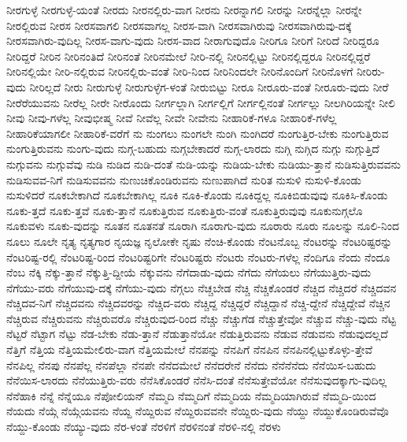 {ನೀರಗುಳ್ಳೆ
ನೀರಗುಳ್ಳೆ-ಯಂತೆ
ನೀರದು
ನೀರನಲ್ಲಿರು-ವಾಗ
ನೀರನು
ನೀರನ್ನಾಗಲಿ
ನೀರನ್ನು
ನೀರನ್ನೆಲ್ಲಾ
ನೀರನ್ನೇ
ನೀರಲ್ಲಿರುವ
ನೀರಸ
ನೀರಸವಾಗಲಿ
ನೀರಸವಾಗಲ್ಲ
ನೀರಸ-ವಾಗಿ
ನೀರಸವಾಗಿರುವು
ನೀರಸವಾಗಿರುವು-ದಕ್ಕೆ
ನೀರಸವಾಗಿರು-ವುದಿಲ್ಲ
ನೀರಸ-ವಾಗು-ವುದು
ನೀರಸ-ವಾದ
ನೀರಾಗುವುದೊ
ನೀರಿಗೂ
ನೀರಿಗೆ
ನೀರಿದೆ
ನೀರಿದ್ದರೂ
ನೀರಿದ್ದರೆ
ನೀರಿನ
ನೀರಿನಂತಿದೆ
ನೀರಿನಂತೆ
ನೀರಿನಮೇಲೆ
ನೀರಿ-ನಲ್ಲಿ
ನೀರಿನಲ್ಲಿಟ್ಟು
ನೀರಿನಲ್ಲಿದ್ದರೂ
ನೀರಿನಲ್ಲಿದ್ದರೆ
ನೀರಿನಲ್ಲಿಯೇ
ನೀರಿ-ನಲ್ಲಿರುವ
ನೀರಿನಲ್ಲಿರು-ವಂತೆ
ನೀರಿ-ನಿಂದ
ನೀರಿನಿಂದಲೇ
ನೀರಿನೊಂದಿಗೆ
ನೀರಿನೊಳಗೆ
ನೀರಿರು-ವುದು
ನೀರಿಲ್ಲದೆ
ನೀರು
ನೀರುಗುಳ್ಳೆ
ನೀರುಗುಳ್ಳೆಗ-ಳಂತೆ
ನೀರುಬಿಟ್ಟು
ನೀರೂ
ನೀರೂರು-ವಂತೆ
ನೀರೂರು-ವುದು
ನೀರೆ
ನೀರೆರೆಯುವನು
ನೀರೆಲ್ಲ
ನೀರೇ
ನೀರೊಂದು
ನೀರ್ಗಲ್ಲಾಗಿ
ನೀರ್ಗಲ್ಲಿಗೆ
ನೀರ್ಗಲ್ಲಿನಂತೆ
ನೀರ್ಗಲ್ಲು
ನೀಲಗಿರಿಯನ್ನೇ
ನೀಲಿ
ನೀವು
ನೀವು-ಗಳೆಲ್ಲ
ನೀವುಭೀಷ್ಮ
ನೀವೆ
ನೀವೆಲ್ಲ
ನೀವೇ
ನೀವೇನು
ನೀಹಾರಿಕೆ-ಗಳೂ
ನೀಹಾರಿಕೆ-ಗಳೆಲ್ಲ
ನೀಹಾರಿಕೆಯಾಗಲೀ
ನೀಹಾರಿಕೆ-ವರೆಗೆ
ನು
ನುಂಗಲು
ನುಂಗಲೇ
ನುಂಗಿ
ನುಂಗಿದರೆ
ನುಂಗುತ್ತಿರ-ಬೇಕು
ನುಂಗುತ್ತಿರುವ
ನುಂಗುತ್ತಿರುವನು
ನುಂಗು-ವುದು
ನುಗ್ಗ-ಬಹುದು
ನುಗ್ಗಬೇಕಾದರೆ
ನುಗ್ಗ-ಲಾರದು
ನುಗ್ಗಿ
ನುಗ್ಗಿದ
ನುಗ್ಗು
ನುಗ್ಗುತ್ತಿದೆ
ನುಗ್ಗುವನು
ನುಗ್ಗುವೆವು
ನುಡಿ
ನುಡಿದ
ನುಡಿ-ದಂತೆ
ನುಡಿ-ಯನ್ನು
ನುಡಿಯ-ಬೇಕು
ನುಡಿಯು-ತ್ತಾನೆ
ನುಡಿಸುತ್ತಿರುವವನು
ನುಡಿಸುವವ-ನಿಗೆ
ನುಡಿಸುವವನು
ನುಣುಚಿಕೊಂಡಿರುವನು
ನುಣುಪಾಗಿದೆ
ನುರಿತ
ನುಸುಳಿ
ನುಸುಳಿ-ಕೊಂಡು
ನುಸುಳಿದರೆ
ನೂಕಬೇಕಾಗಿದೆ
ನೂಕಬೇಕಾಗಿಲ್ಲ
ನೂಕಿ
ನೂಕಿ-ಕೊಂಡು
ನೂಕಿದ್ದಲ್ಲ
ನೂಕಿಬಿಡುವುವು
ನೂಕಿಸಿ-ಕೊಂಡು
ನೂಕು-ತ್ತದೆ
ನೂಕು-ತ್ತವೆ
ನೂಕು-ತ್ತಾನೆ
ನೂಕುತ್ತಿರುವ
ನೂಕುತ್ತಿರು-ವಂತೆ
ನೂಕುತ್ತಿರುವುವು
ನೂಕುನುಗ್ಗಲೊ
ನೂಕುವಳು
ನೂಕು-ವುದನ್ನು
ನೂತನ
ನೂತನತೆ
ನೂರಾಗಿ
ನೂರಾಗು-ವುದು
ನೂರಾರು
ನೂರು
ನೂಲನ್ನು
ನೂಲಿ-ನಿಂದ
ನೂಲು
ನೂಲೇ
ನೃತ್ಯ
ನೃತ್ಯಗಾರ
ನೃಯಜ್ಞ
ನೃಲೋಕೇ
ನೃಷು
ನೆಂಚಿ-ಕೊಂಡು
ನೆಂಟನೊಬ್ಬ
ನೆಂಟರನ್ನು
ನೆಂಟರಿಷ್ಟರನ್ನು
ನೆಂಟರಿಷ್ಟ-ರಲ್ಲಿ
ನೆಂಟರಿಷ್ಟ-ರಿಂದ
ನೆಂಟರಿಷ್ಟರಿಗೇ
ನೆಂಟರಿಷ್ಟರು
ನೆಂಟರು
ನೆಂಟರು-ಗಳೆಲ್ಲ
ನೆಂದಿಗೂ
ನೆಂದು
ನೆಂದೂ
ನೆಂಬ
ನೆಕ್ಕಿ
ನೆಕ್ಕು-ತ್ತಾನೆ
ನೆಕ್ಕುತ್ತಿ-ದ್ದೀಯೆ
ನೆಕ್ಕುವನು
ನೆಗೆದಾಡು-ವುದು
ನೆಗೆದು
ನೆಗೆಯಲು
ನೆಗೆಯುತ್ತಿರು-ವುದು
ನೆಗೆಯು-ವರು
ನೆಗೆಯುವು-ದಕ್ಕೆ
ನೆಗೆಯು-ವುದು
ನೆಗ್ಗಲು
ನೆಚ್ಚಬೇಡ
ನೆಚ್ಚಿ
ನೆಚ್ಚಿಕೊಂಡರೆ
ನೆಚ್ಚಿದ
ನೆಚ್ಚಿದರೆ
ನೆಚ್ಚಿದವನ
ನೆಚ್ಚಿದವ-ನಿಗೆ
ನೆಚ್ಚಿದವನು
ನೆಚ್ಚಿದವರನ್ನು
ನೆಚ್ಚಿದ-ವರು
ನೆಚ್ಚಿದ್ದ
ನೆಚ್ಚಿದ್ದರೆ
ನೆಚ್ಚಿದ್ದಾನೆ
ನೆಚ್ಚಿ-ದ್ದೇನೆ
ನೆಚ್ಚಿದ್ದೇವೆ
ನೆಚ್ಚಿನ
ನೆಚ್ಚಿರುವ
ನೆಚ್ಚಿರುವನು
ನೆಚ್ಚಿರುವರೊ
ನೆಚ್ಚಿರುವುದ-ರಿಂದ
ನೆಚ್ಚು
ನೆಚ್ಚುಗೆಡ
ನೆಚ್ಚುತ್ತೇವೋ
ನೆಚ್ಚುವ
ನೆಚ್ಚು-ವುದು
ನೆಟ್ಟ
ನೆಟ್ಟರೆ
ನೆಟ್ಟಾಗ
ನೆಟ್ಟು
ನೆಡ-ಬೇಕು
ನೆಡು-ತ್ತಾನೆ
ನೆಡುತ್ತಾನೆಯೋ
ನೆಡುತ್ತಿರುವನು
ನೆಡುವ
ನೆಡುವನು
ನೆಡುವುದಲ್ಲದೆ
ನೆತ್ತಿಗೆ
ನೆತ್ತಿಯ
ನೆತ್ತಿಯಮೇಲಿರು-ವಾಗ
ನೆತ್ತಿಯಮೇಲೆ
ನೆನಪನ್ನು
ನೆನಪಿಗೆ
ನೆನಪಿನ
ನೆನಪಿನಲ್ಲಿಟ್ಟುಕೊಳ್ಳು-ತ್ತೇವೆ
ನೆನಪಿಲ್ಲ
ನೆನಪು
ನೆನಪೆಲ್ಲ
ನೆನಪೆಲ್ಲಾ
ನೆನಪೇ
ನೆನೆದಮೇಲೆ
ನೆನೆದರೇನೆ
ನೆನೆದು
ನೆನೆನೆನೆದು
ನೆನೆಯಿಸ-ಬಹುದು
ನೆನೆಯಿಸ-ಲಾರದು
ನೆನೆಯುತ್ತಿರು-ವರು
ನೆನೆಸಿಕೊಂಡರೆ
ನೆನೆಸಿ-ದಂತೆ
ನೆನೆಸುತ್ತೇವೆಯೋ
ನೆನೆಸುವುದಕ್ಕಾಗು-ವುದಿಲ್ಲ
ನೆನೆಹಾಕಿ
ನೆನ್ನೆ
ನೆನ್ನೆಯೂ
ನೆಪೋಲಿಯನ್
ನೆಮ್ಮದಿ
ನೆಮ್ಮದಿಗೆ
ನೆಮ್ಮದಿಯ
ನೆಮ್ಮದಿಯಾಗಿರುವೆ
ನೆಮ್ಮದಿ-ಯಿಂದ
ನೆಯದು
ನೆಯ್ಗೆ
ನೆಯ್ಗೆಯವನು
ನೆಯ್ದ
ನೆಯ್ದಿರುವ
ನೆಯ್ದಿರುವವನೇ
ನೆಯ್ದಿರು-ವುದು
ನೆಯ್ದು
ನೆಯ್ದುಕೊಂಡಿರುವೆವೊ
ನೆಯ್ದು-ಕೊಂಡು
ನೆಯ್ಯು-ವುದು
ನೆರ-ಳಂತೆ
ನೆರಳಿಗೆ
ನೆರಳಿನಂತೆ
ನೆರಳಿ-ನಲ್ಲಿ
ನೆರಳು
}
